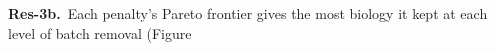 \documentclass[10pt]{article}
\newcommand{\pp}[2]{\par\vspace{3pt}\noindent\textbf{#1.}\ #2\par\nopagebreak}
\begin{document}
\noindent{}
\pp{Res-3b}{Each penalty's Pareto frontier gives the most biology it kept at each level of batch removal (Figure \replaced[id=P24]{3).}{4).}}
\end{document}
